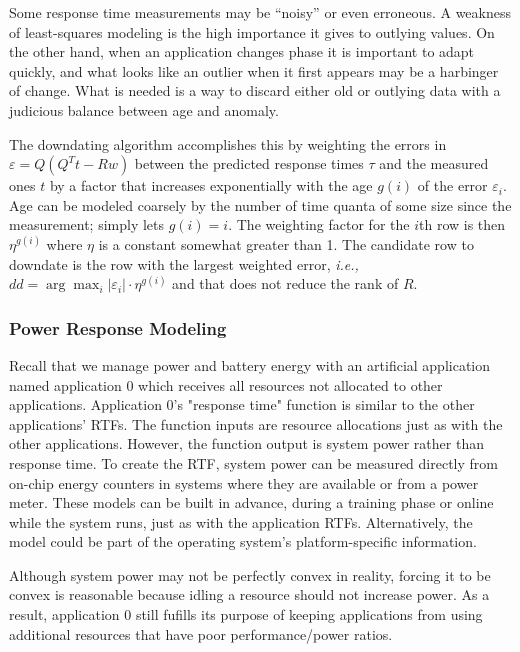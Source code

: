 Some response time measurements may be ``noisy'' or even erroneous.
A weakness of least-squares modeling is the high importance it gives to outlying values.
On the other hand, when an application changes phase it is important to adapt quickly,
and what looks like an outlier when it first appears may be a harbinger of change.
What is needed is a way to discard either old or outlying data
with a judicious balance between age and anomaly.

The downdating algorithm accomplishes this by weighting the errors in $\varepsilon = Q(Q^Tt - Rw)$
between the predicted response times $\tau$ and the measured ones $t$ by a factor
that increases exponentially with the age $g(i)$ of the error $\varepsilon_i$.
Age can be modeled coarsely by the number of time quanta of some size since the measurement;
\pacora simply lets $g(i) = i$.
The weighting factor for the $i$th row is then $\eta^{g(i)}$ where $\eta$ is a constant somewhat greater than 1.
The candidate row to downdate is the row with the largest weighted error, \emph{i.e.,}
$dd = \arg\max_i |\varepsilon_i| \cdot \eta^{g(i)}$ and that does not reduce the rank of $R$.


\subsubsection*{Power Response Modeling}
Recall that we manage power and battery energy with an artificial application named application 0 which receives all resources not allocated to other applications. Application 0's "response time" function is similar to the other applications' RTFs.  The function inputs are resource allocations just as with the other applications.  However, the function output is system power rather than response time.   To create the RTF, system power can be measured directly from on-chip energy counters in systems where they are available or from a power meter.  These models can be built in advance, during a training phase or online while the system runs, just as with the application RTFs.  Alternatively, the model could be part of the operating system's platform-specific information.

Although system power may not be perfectly convex in reality, forcing it to be convex is reasonable because idling a resource should not increase power.  As a result, application 0 still fufills its purpose of keeping applications from using additional resources that have poor performance/power ratios.



